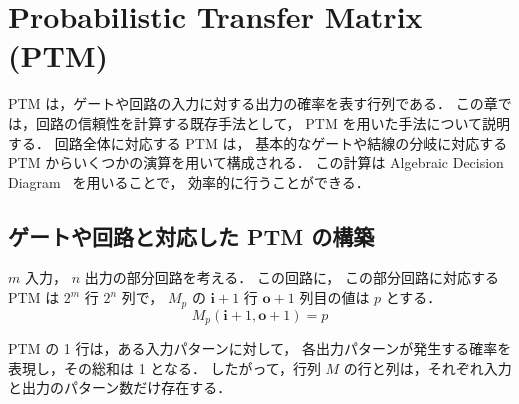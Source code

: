 \chapter{Probabilistic Transfer Matrix (PTM)}\label{sec:ptm}

PTM は，ゲートや回路の入力に対する出力の確率を表す行列である．
この章では，回路の信頼性を計算する既存手法として，
PTM を用いた手法について説明する．
回路全体に対応する PTM は，
基本的なゲートや結線の分岐に対応する PTM からいくつかの演算を用いて構成される．
この計算は Algebraic Decision Diagram~ を用いることで，
効率的に行うことができる．

\section{ゲートや回路と対応した PTM の構築} \label{sec:ptm-const}

$m$ 入力， $n$ 出力の部分回路を考える．
この回路に，
この部分回路に対応する PTM は $2^m$ 行 $2^n$ 列で，
$M_p$ の $\bm i + 1$ 行 $\bm o + 1$ 列目の値は $p$ とする．
\[ M_p(\bm i + 1, \bm o + 1) = p \]

PTM の 1 行は，ある入力パターンに対して，
各出力パターンが発生する確率を表現し，その総和は 1 となる．
したがって，行列 $M$ の行と列は，それぞれ入力と出力のパターン数だけ存在する．

